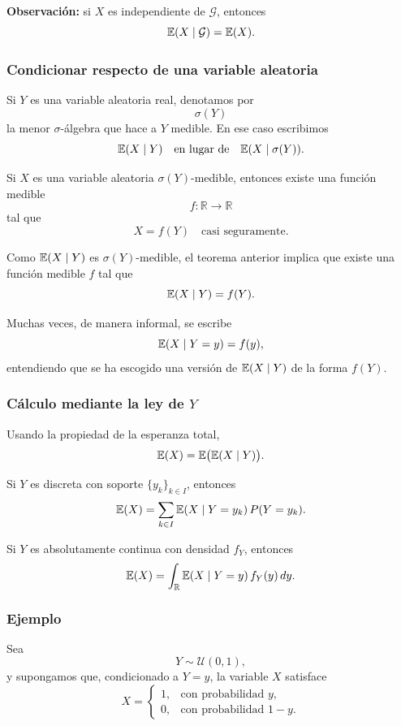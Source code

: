 \medskip

\noindent
\textbf{Observación:} si \(X\) es independiente de \(\mathcal{G}\), entonces
\[
\mathbb{E}(X\mid\mathcal{G})=\mathbb{E}(X).
\]

\subsubsection*{Condicionar respecto de una variable aleatoria}

Si \(Y\) es una variable aleatoria real, denotamos por
\[
\sigma(Y)
\]
la menor \(\sigma\)-álgebra que hace a \(Y\) medible. En ese caso escribimos
\[
\mathbb{E}(X\mid Y)
\quad \text{en lugar de} \quad
\mathbb{E}(X\mid \sigma(Y)).
\]

\begin{teo}
Si \(X\) es una variable aleatoria \(\sigma(Y)\)-medible, entonces existe una función medible
\[
f:\mathbb{R}\to\mathbb{R}
\]
tal que
\[
X=f(Y)
\quad \text{casi seguramente}.
\]
\end{teo}

Como \(\mathbb{E}(X\mid Y)\) es \(\sigma(Y)\)-medible, el teorema anterior implica que existe una función medible \(f\) tal que
\[
\mathbb{E}(X\mid Y)=f(Y).
\]

Muchas veces, de manera informal, se escribe
\[
\mathbb{E}(X\mid Y=y)=f(y),
\]
entendiendo que se ha escogido una versión de \(\mathbb{E}(X\mid Y)\) de la forma \(f(Y)\).

\subsubsection*{Cálculo mediante la ley de \(Y\)}

Usando la propiedad de la esperanza total,
\[
\mathbb{E}(X)=\mathbb{E}\big(\mathbb{E}(X\mid Y)\big).
\]

Si \(Y\) es discreta con soporte \(\{y_k\}_{k\in I}\), entonces
\[
\mathbb{E}(X)=\sum_{k\in I} \mathbb{E}(X\mid Y=y_k)\,P(Y=y_k).
\]

Si \(Y\) es absolutamente continua con densidad \(f_Y\), entonces
\[
\mathbb{E}(X)=\int_{\mathbb{R}} \mathbb{E}(X\mid Y=y)\,f_Y(y)\,dy.
\]

\subsubsection*{Ejemplo}

Sea
\[
Y\sim \mathcal{U}(0,1),
\]
y supongamos que, condicionado a \(Y=y\), la variable \(X\) satisface
\[
X=
\begin{cases}
1, & \text{con probabilidad } y,\\
0, & \text{con probabilidad } 1-y.
\end{cases}
\]

